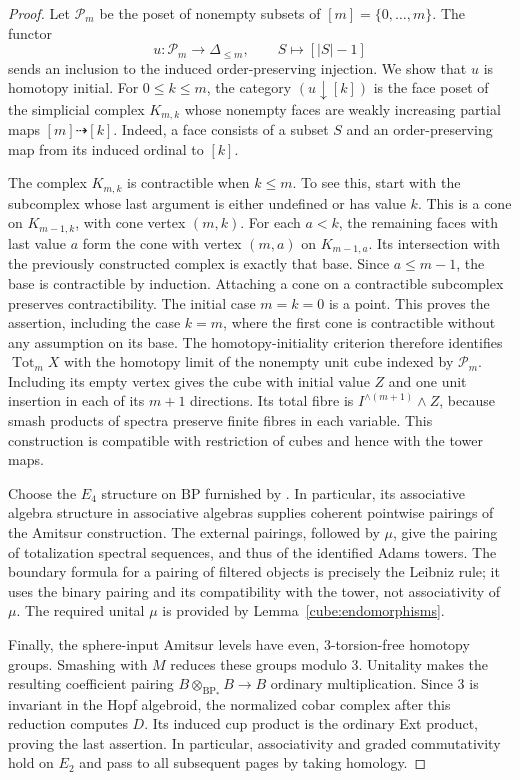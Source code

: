 \documentclass[11pt]{article}
\theoremstyle{definition}
\theoremstyle{remark}
\numberwithin{equation}{section}
\begin{document}
\begin{proof}
Let $\mathcal P_m$ be the poset of nonempty subsets of
$[m]=\{0,\ldots,m\}$.  The functor
\[
 u\colon\mathcal P_m\longrightarrow\Delta_{\leq m},\qquad
 S\longmapsto[|S|-1]
\]
sends an inclusion to the induced order-preserving injection.  We show
that $u$ is homotopy initial.  For $0\leq k\leq m$, the category
$(u\downarrow[k])$ is the face poset of the simplicial complex
$K_{m,k}$ whose nonempty faces are weakly increasing partial maps
$[m]\dashrightarrow[k]$.  Indeed, a face consists of a subset $S$ and
an order-preserving map from its induced ordinal to $[k]$.

The complex $K_{m,k}$ is contractible when $k\leq m$.  To see this,
start with the subcomplex whose last argument is either undefined or
has value $k$.  This is a cone on $K_{m-1,k}$, with cone vertex $(m,k)$.
For each $a<k$, the remaining faces with last value $a$ form the cone
with vertex $(m,a)$ on $K_{m-1,a}$.  Its intersection with the previously
constructed complex is exactly that base.  Since $a\leq m-1$, the base
is contractible by induction.  Attaching a cone on a contractible
subcomplex preserves contractibility.  The initial case $m=k=0$ is a
point.  This proves the assertion, including the case $k=m$, where the
first cone is contractible without any assumption on its base.
The homotopy-initiality criterion therefore identifies $\operatorname{Tot}_m X$ with
the homotopy limit of the nonempty unit cube indexed by $\mathcal P_m$.
Including its empty vertex gives the cube with initial value $Z$ and
one unit insertion in each of its $m+1$ directions.  Its total fibre is
$I^{\wedge(m+1)}\wedge Z$, because smash products of spectra preserve
finite fibres in each variable.  This construction is compatible with
restriction of cubes and hence with the tower maps.

Choose the $E_4$ structure on $\mathrm{BP}$ furnished by
\cite[Theorem~1.1]{BasterraMandell}.  In particular, its associative algebra
structure in associative algebras supplies coherent pointwise pairings
of the Amitsur construction.  The external pairings, followed by
$\mu$, give the pairing of totalization spectral sequences, and thus
of the identified Adams towers.  The boundary formula for a pairing
of filtered objects is precisely the Leibniz rule; it uses the binary
pairing and its compatibility with the tower, not associativity of
$\mu$.  The required unital $\mu$ is provided by
Lemma~\ref{cube:endomorphisms}.

Finally, the sphere-input Amitsur levels have even, $3$-torsion-free
homotopy groups.  Smashing with $M$ reduces these groups modulo $3$.
Unitality makes the resulting coefficient pairing
$B\otimes_{\mathrm{BP}_*}B\longrightarrow B$ ordinary multiplication.
Since $3$ is invariant in the Hopf algebroid, the normalized cobar
complex after this reduction computes $D$.  Its induced cup product
is the ordinary Ext product, proving the last assertion.  In
particular, associativity and graded commutativity hold on $E_2$ and
pass to all subsequent pages by taking homology.
\end{proof}
\end{document}
